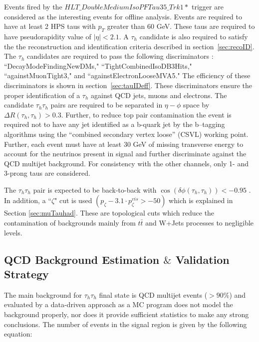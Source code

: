 Events fired by the $HLT\_DoubleMediumIsoPFTau35\_Trk1*$ trigger are considered as the interesting events for offline analysis. Events are required to have at 
least 2 HPS taus with $p_{T}$ greater than 60 GeV. These taus are required to have pseudorapidity value of $|\eta| < 2.1$. A $\tau_{h}$ candidate is also 
required to satisfy the the reconstruction and identification criteria described in section~\ref{sec:recoID}. The $\tau_{h}$ candidates are required to pass the 
following discriminators : ``DecayModeFindingNewDMs," ``TightCombinedIsoDB3Hits," ``againstMuonTight3,"  and ``againstElectronLooseMVA5."  The efficiency of 
these discriminators is shown in section~\ref{sec:tauIDeff}. These discriminators ensure the proper identification of a $\tau_{h}$ against QCD jets, muons and electrons. The candidate $\tau_{h}\tau_{h}$ pairs are required to be separated in $\eta-\phi$ space by $\Delta R(\tau_{h},\tau_{h}) > 0.3 $. Further, to reduce top pair contamination the event is required not to have any jet identified as a b-quark jet by the b–tagging algorithms using the “combined secondary vertex loose” (CSVL) working point. Further, each event must have at least 30 GeV of missing transverse energy to account for the neutrinos present in signal and further discriminate against the QCD multijet background. For consistency with the other channels, only 1- and 3-prong taus are considered. 

The $\tau_{h}\tau_{h}$ pair is expected to be back-to-back with $\cos(\delta\phi(\tau_{h},\tau_{h})) < -0.95$ . In addition, a ``$\zeta$" cut is used 
$(p_{\zeta}- 3.1\cdot p_{\zeta}^{vis} > -50)$ which is explained in Section \ref{sec:muTauhad}. These are topological cuts which reduce the contamination of backgrounds mainly from  $t\bar{t}$ and W+Jets processes to negligible levels.  



\subsection{QCD Background Estimation $\&$ Validation Strategy}

The main background for $\tau_{h}\tau_{h}$ final state is QCD multijet events ($>90\%$) and evaluated by a data-driven approach as a MC program does not model the background properly, nor does it provide sufficient statistics to make any strong conclusions.
The number of events in the signal region is given by the following equation: 

